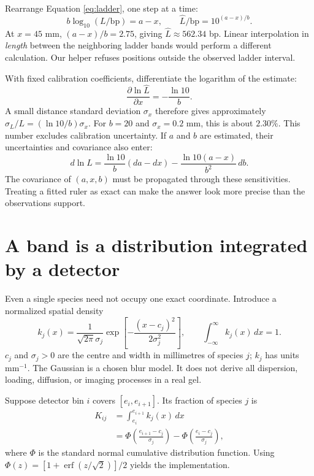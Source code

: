 Rearrange Equation \ref{eq:ladder}, one step at a time:
\begin{equation}
b\log_{10}(L/\mathrm{bp})=a-x,\qquad
\widehat L/\mathrm{bp}=10^{(a-x)/b}. \label{eq:size}
\end{equation}
At $x=45$ mm, $(a-x)/b=2.75$, giving $\widehat L\approx562.34$ bp. Linear interpolation in \emph{length} between the neighboring ladder bands would perform a different calculation. Our helper refuses positions outside the observed ladder interval.

With fixed calibration coefficients, differentiate the logarithm of the estimate:
\begin{equation}
\frac{\partial\ln\widehat L}{\partial x}=-\frac{\ln10}{b}.
\end{equation}
A small distance standard deviation $\sigma_x$ therefore gives approximately
$\sigma_L/L=(\ln10/b)\sigma_x$. For $b=20$ and $\sigma_x=0.2$ mm, this is about $2.30\%$. This number excludes calibration uncertainty. If $a$ and $b$ are estimated, their uncertainties and covariance also enter:
\begin{equation}
d\ln L=\frac{\ln10}{b}(da-dx)
-\frac{\ln10(a-x)}{b^2}\,db.
\end{equation}
The covariance of $(a,x,b)$ must be propagated through these sensitivities. Treating a fitted ruler as exact can make the answer look more precise than the observations support.

\section{A band is a distribution integrated by a detector}
Even a single species need not occupy one exact coordinate. Introduce a normalized spatial density
\begin{equation}
k_j(x)=\frac{1}{\sqrt{2\pi}\sigma_j}
\exp\left[-\frac{(x-c_j)^2}{2\sigma_j^2}\right],
\qquad \int_{-\infty}^{\infty}k_j(x)\,dx=1.
\end{equation}
$c_j$ and $\sigma_j>0$ are the centre and width in millimetres of species $j$; $k_j$ has units $\mathrm{mm}^{-1}$. The Gaussian is a chosen blur model. It does not derive all dispersion, loading, diffusion, or imaging processes in a real gel.

Suppose detector bin $i$ covers $[e_i,e_{i+1}]$. Its fraction of species $j$ is
\begin{align}
K_{ij}&=\int_{e_i}^{e_{i+1}}k_j(x)\,dx\\
&=\Phi\left(\frac{e_{i+1}-c_j}{\sigma_j}\right)
-\Phi\left(\frac{e_i-c_j}{\sigma_j}\right), \label{eq:bin}
\end{align}
where $\Phi$ is the standard normal cumulative distribution function.
Using $\Phi(z)=[1+\operatorname{erf}(z/\sqrt2)]/2$ yields the implementation.

